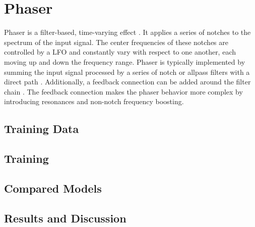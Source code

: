 
\chapter{Phaser}
\label{chap:phaser}
Phaser is a filter-based, time-varying effect \cite{Zoelzer2011}. It applies a series of notches to the spectrum of the input signal. The center frequencies of these notches are controlled by a \ac{LFO} and constantly vary with respect to one another, each moving up and down the frequency range. Phaser is typically implemented by summing the input signal processed by a series of notch or allpass filters with a direct path \cite{Zoelzer2011}. Additionally, a feedback connection can be added around the filter chain \cite{Kiiski2016}. The feedback connection makes the phaser behavior more complex by introducing resonances and non-notch frequency boosting.


\section{Training Data}
\label{sec:phaser_training_data}

\section{Training}
\label{sec:phaser_training}

\section{Compared Models}
\label{sec:phaser_models}

\section{Results and Discussion}
\label{sec:phaser_results}

